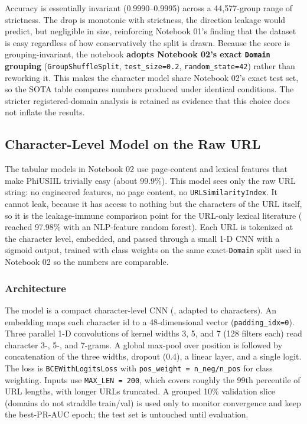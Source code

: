 \documentclass[stu,12pt,floatsintext]{apa7}
\newcommand{\code}[1]{\texttt{#1}}
\begin{document}
Accuracy is essentially invariant (0.9990--0.9995) across a 44{,}577-group
range of strictness. The drop is monotonic with strictness, the direction
leakage would predict, but negligible in size, reinforcing Notebook 01's
finding that the dataset is easy regardless of how conservatively the
split is drawn. Because the score is grouping-invariant, the notebook
\textbf{adopts Notebook 02's exact \code{Domain} grouping}
(\code{GroupShuffleSplit}, \code{test\_size=0.2}, \code{random\_state=42})
rather than reworking it. This makes the character model share Notebook
02's exact test set, so the SOTA table compares numbers produced under
identical conditions. The stricter registered-domain analysis is retained
as evidence that this choice does not inflate the results.

\subsection{Character-Level Model on the Raw URL}

The tabular models in Notebook 02 use page-content and lexical features
that make PhiUSIIL trivially easy (about 99.9\%). This model sees only the
raw URL string: no engineered features, no page content, no
\code{URLSimilarityIndex}. It cannot leak, because it has access to
nothing but the characters of the URL itself, so it is the leakage-immune
comparison point for the URL-only lexical literature
(\textcite{sahingoz2019} reached 97.98\% with an NLP-feature random
forest). Each URL is tokenized at the character level, embedded, and
passed through a small 1-D CNN with a sigmoid output, trained with class
weights on the same exact-\code{Domain} split used in Notebook 02 so the
numbers are comparable.

\subsubsection{Architecture}

The model is a compact character-level CNN (\textcite{kim2014}, adapted to
characters). An embedding maps each character id to a 48-dimensional
vector (\code{padding\_idx=0}). Three parallel 1-D convolutions of kernel
widths 3, 5, and 7 (128 filters each) read character 3-, 5-, and 7-grams.
A global max-pool over position is followed by concatenation of the three
widths, dropout (0.4), a linear layer, and a single logit. The loss is
\code{BCEWithLogitsLoss} with \code{pos\_weight = n\_neg/n\_pos} for class
weighting. Inputs use \code{MAX\_LEN = 200}, which covers roughly the
99th percentile of URL lengths, with longer URLs truncated. A grouped 10\%
validation slice (domains do not straddle train/val) is used only to
monitor convergence and keep the best-PR-AUC epoch; the test set is
untouched until evaluation.
\end{document}
